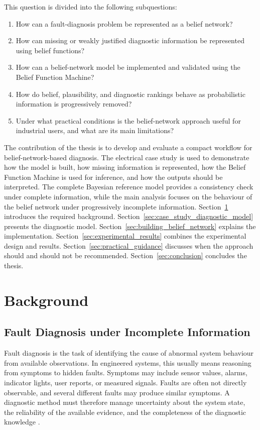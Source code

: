\documentclass[runningheads]{llncs}
\begin{document}
This question is divided into the following subquestions:

\begin{enumerate}
    \item How can a fault-diagnosis problem be represented as a belief network?
    \item How can missing or weakly justified diagnostic information be represented using belief functions?
    \item How can a belief-network model be implemented and validated using the Belief Function Machine?
    \item How do belief, plausibility, and diagnostic rankings behave as probabilistic information is progressively removed?
    \item Under what practical conditions is the belief-network approach useful for industrial users, and what are its main limitations?
\end{enumerate}

The contribution of the thesis is to develop and evaluate a compact workflow for belief-network-based diagnosis. The electrical case study is used to demonstrate how the model is built, how missing information is represented, how the Belief Function Machine is used for inference, and how the outputs should be interpreted. The complete Bayesian reference model provides a consistency check under complete information, while the main analysis focuses on the behaviour of the belief network under progressively incomplete information. Section~\ref{sec:background} introduces the required background. Section~\ref{sec:case_study_diagnostic_model} presents the diagnostic model. Section~\ref{sec:building_belief_network} explains the implementation. Section~\ref{sec:experimental_results} combines the experimental design and results. Section~\ref{sec:practical_guidance} discusses when the approach should and should not be recommended. Section~\ref{sec:conclusion} concludes the thesis.

\section{Background}
\label{sec:background}

\subsection{Fault Diagnosis under Incomplete Information}
\label{sec:fault_diagnosis_uncertainty}

Fault diagnosis is the task of identifying the cause of abnormal system behaviour from available observations. In engineered systems, this usually means reasoning from symptoms to hidden faults. Symptoms may include sensor values, alarms, indicator lights, user reports, or measured signals. Faults are often not directly observable, and several different faults may produce similar symptoms. A diagnostic method must therefore manage uncertainty about the system state, the reliability of the available evidence, and the completeness of the diagnostic knowledge \cite{Venkatasubramanian2003PartI,Venkatasubramanian2003PartII,Venkatasubramanian2003PartIII,Isermann2006}.
\end{document}
